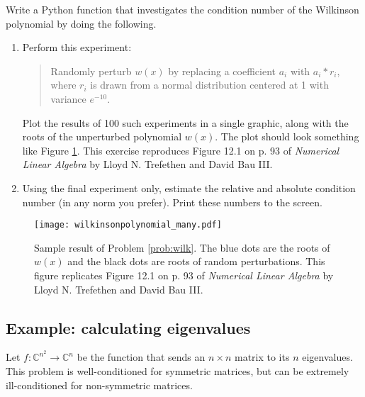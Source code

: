 \begin{problem}\label{prob:wilk}
Write a Python function that investigates the condition number of the Wilkinson polynomial by doing the following.
\begin{enumerate}
\item Perform this experiment:

\begin{quote}
Randomly perturb $w(x)$ by replacing a coefficient $a_i$ with $a_i*r_i$, where $r_i$ is drawn from a normal distribution centered at 1 with variance $e^{-10}$.
\end{quote}

Plot the results of 100 such experiments in a single graphic, along with the roots of the unperturbed polynomial $w(x)$. The plot should look something like Figure \ref{fig:wilkinsonpolynomial_many}. This exercise reproduces Figure 12.1 on p. 93 of \emph{Numerical Linear Algebra} by Lloyd N. Trefethen and David Bau III.
\item Using the final experiment only, estimate the relative and absolute condition number (in any norm you prefer). Print these numbers to the screen.
\end{enumerate}
\begin{figure}[H]
\texttt{[image: wilkinsonpolynomial\_many.pdf]}
\caption{Sample result of Problem \ref{prob:wilk}.
The blue dots are the roots of $w(x)$ and the black dots are roots of random perturbations.
This figure replicates Figure 12.1 on p. 93 of \emph{Numerical Linear Algebra} by Lloyd N. Trefethen and David Bau III.}
\label{fig:wilkinsonpolynomial_many}
\end{figure}

\end{problem}

\begin{comment}
Notes on Problem 1:
 - Make something to copy-paste with the polynomial coefficients
 - You MUST copy paste the exact coefficients!!! Multiplying out the polynomial is not stable!!!
 - Also "compute" the roots of the wilkinson poly. They are close but not quite right. The difference is not visible on the graph. See that is probably useful.

 In introductory discussion, compute the condition number of the problem. Explain why we use the infinity norm.
\end{comment}

\subsection*{Example: calculating eigenvalues}
Let $f:\mathbb{C}^{n^2} \rightarrow \mathbb{C}^n$ be the function that sends an $n \times n$ matrix to its $n$ eigenvalues.
This problem is well-conditioned for symmetric matrices, but can be extremely ill-conditioned for non-symmetric matrices.

